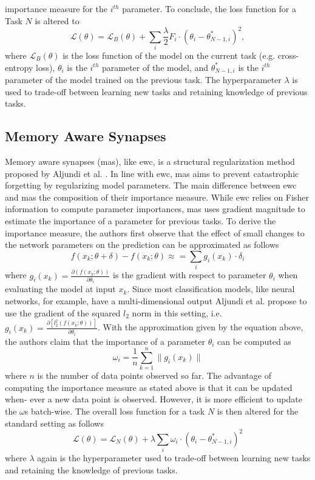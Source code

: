 importance measure for the $i^{th}$ parameter. To conclude, the loss function for a Task $N$ is altered to
\begin{equation}
    \mathcal{L}(\theta) = \mathcal{L}_B(\theta) + \sum_i \frac{\lambda}{2} F_i \cdot (\theta_i - \theta^*_{N-1,i})^2,
\end{equation}
where $\mathcal{L}_B(\theta)$ is the loss function of the model on the current task (e.g. cross-entropy loss), $\theta_i$ is the $i^{th}$ parameter of the model,
and $\theta^*_{N-1,i}$ is the $i^{th}$ parameter of the model trained on the previous task. The hyperparameter $\lambda$ is used to trade-off between
learning new tasks and retaining knowledge of previous tasks.

\subsection{Memory Aware Synapses}
\label{sec:Related_work:Continual_Learning:MAS}
Memory aware synapses (\gls{mas}), like \gls{ewc}, is a structural regularization method proposed by Aljundi et al. \cite{aljundi2018memory}. 
In line with \gls{ewc}, \gls{mas} aims to prevent catastrophic forgetting by regularizing model parameters. The main difference between \gls{ewc} and
\gls{mas} the composition of their importance measure. While \gls{ewc} relies on Fisher information to compute parameter importances, \gls{mas} uses
gradient magnitude to estimate the importance of a parameter for previous tasks. To derive the importance measure, the authors first observe that the
effect of small changes to the network parameters on the prediction can be approximated as follows
\begin{equation}
    f(x_k; \theta + \delta) - f(x_k; \theta) \approx = \sum_i g_i(x_k) \cdot \delta_i
\end{equation}
where $g_i(x_k) = \frac{\partial(f(x_k;\theta))}{\partial \theta_i}$  is the gradient with respect to parameter $\theta_i$ when evaluating the model at
input $x_k$. Since most classification models, like neural networks, for example, have a multi-dimensional output Aljundi et al. propose to use the gradient
of the squared $l_2$ norm in this setting, i.e. $g_i(x_k) =  \frac{\partial[l^2_2(f(x_k;\theta))]}{\partial \theta_i}$. With the approximation given by the
equation above, the authors claim that the importance of a parameter $\theta_i$ can be computed as
\begin{equation}
    \omega_i = \frac{1}{n} \sum_{k=1}^n \lVert g_i(x_k) \rVert
\end{equation}
where $n$ is the number of data points observed so far. The advantage of computing the importance measure as stated above is that it can be updated when-
ever a new data point is observed. However, it is more efficient to update the $\omega$s batch-wise. The overall loss function for a task $N$ is
then altered for the standard setting as follows
\begin{equation}
    \mathcal{L}(\theta) = \mathcal{L}_N(\theta) + \lambda \sum_i \omega_i \cdot (\theta_i - \theta^*_{N-1,i})^2
\end{equation}
where $\lambda$ again is the hyperparameter used to trade-off between learning new tasks and retaining the knowledge of previous tasks.

